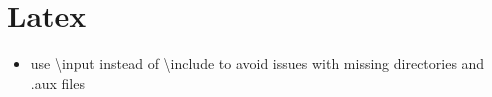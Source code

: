 \hypertarget{latex}{%
\chapter{Latex}\label{latex}}

\begin{itemize}
\tightlist
\item
  use \textbackslash input instead of \textbackslash include to avoid
  issues with missing directories and .aux files
\end{itemize}
